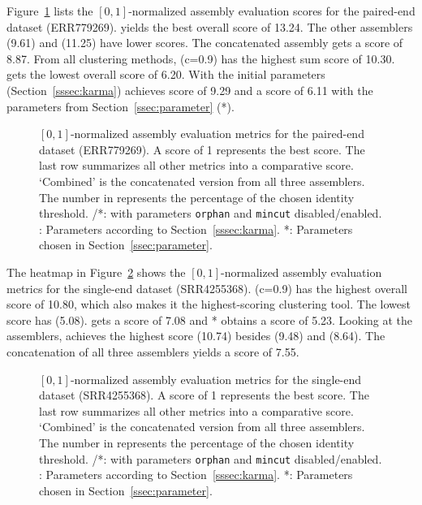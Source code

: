\documentclass[12pt,a4paper,english]{article}
\begin{document}
	\newpage
	Figure~\ref{img:eco_pe} lists the $[0,1]$-normalized assembly evaluation scores for the paired-end \ecoli dataset (ERR779269). \soap yields the best overall score of 13.24. The other assemblers \spades (9.61) and \trinity (11.25) have lower scores. The concatenated assembly gets a score of 8.87. From all clustering methods, \cdhit (c=0.9) has the highest sum score of 10.30. \grouper gets the lowest overall score of 6.20. With the initial parameters (Section~\ref{sssec:karma}) \karma achieves score of 9.29 and a score of 6.11 with the parameters from Section~\ref{ssec:parameter} (\karma{}*).\\
		
	\begin{figure}[H]
		\hspace{-13pt}
		\def\svgwidth{1.1\textwidth}
		
		\caption[Normalized assembly evaluation metrics (\ecoli, PE, ERR779269).]{$[0,1]$-normalized assembly evaluation metrics for the paired-end \ecoli dataset (ERR779269). A score of 1 represents the best score. The last row summarizes all other metrics into a comparative score. `Combined' is the concatenated version from all three assemblers. The number in \cdhit represents the percentage of the chosen identity threshold. \grouper/\grouper{}*: \grouper with parameters \texttt{orphan} and \texttt{mincut} disabled/enabled. \karma: Parameters according to Section~\ref{sssec:karma}. \karma{}*: Parameters chosen in Section~\ref{ssec:parameter}.}
		\label{img:eco_pe}
	\end{figure}


	\newpage
    The heatmap in Figure~\ref{img:eco_se} shows the $[0,1]$-normalized assembly evaluation metrics for the single-end \ecoli dataset (SRR4255368). \cdhit (c=0.9) has the highest overall score of 10.80, which also makes it the highest-scoring clustering tool. The lowest score has \grouper (5.08). \karma gets a score of 7.08  and \karma{}* obtains a score of 5.23.
	Looking at the assemblers, \soap achieves the highest score (10.74) besides \spades (9.48) and \trinity (8.64). The concatenation of all three assemblers yields a score of 7.55.

	\begin{figure}[H]
		\hspace{-13pt}
		\def\svgwidth{1.1\textwidth}
		
		\caption[Normalized assembly evaluation metrics (\ecoli, SE, SRR4255368).]{$[0,1]$-normalized assembly evaluation metrics for the single-end \ecoli dataset (SRR4255368). A score of 1 represents the best score. The last row summarizes all other metrics into a comparative score. `Combined' is the concatenated version from all three assemblers. The number in \cdhit represents the percentage of the chosen identity threshold. \grouper/\grouper{}*: \grouper with parameters \texttt{orphan} and \texttt{mincut} disabled/enabled. \karma: Parameters according to Section~\ref{sssec:karma}. \karma{}*: Parameters chosen in Section~\ref{ssec:parameter}.}
		\label{img:eco_se}
	\end{figure}
\end{document}
